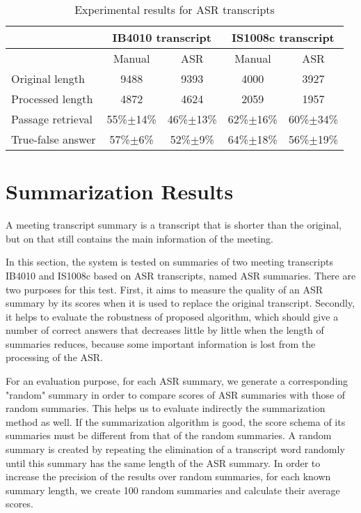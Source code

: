 \begin{table}[htbp]
\caption{Experimental results for ASR transcripts}
\begin{tabular}{|l|c|c|c|c|}
\hline
\multicolumn{1}{|c|}{} & \multicolumn{ 2}{c|}{IB4010 transcript} & \multicolumn{ 2}{c|}{IS1008c transcript} \\ \hline
\multicolumn{1}{|c|}{} & Manual & ASR & Manual & ASR \\ \hline
Original length & 9488 & 9393 & 4000 & 3927 \\ \hline
Processed length & 4872 & 4624 & 2059 & 1957 \\ \hline
Passage retrieval & 55\%\ensuremath{\pm}14\% & 46\%\ensuremath{\pm}13\% & 62\%\ensuremath{\pm}16\% & 60\%\ensuremath{\pm}34\% \\ \hline
True-false answer & 57\%\ensuremath{\pm}6\% & 52\%\ensuremath{\pm}9\% & 64\%\ensuremath{\pm}18\% & 56\%\ensuremath{\pm}19\% \\ \hline
\end{tabular}
\label{results for ASR transcripts}
\end{table}



\section{Summarization Results}

A meeting transcript summary is a transcript that is shorter than the original, but on that still contains the main information of the meeting.

In this section, the system is tested on summaries of two meeting transcripts IB4010 and IS1008c based on ASR transcripts, named ASR summaries. There are two purposes for this test. First, it aims to measure the quality of an ASR summary by its scores when it is used to replace the original transcript. Secondly, it helps to evaluate the robustness of proposed algorithm, which should give a number of correct answers that decreases little by little when the length of summaries reduces, because some important information is lost from the processing of the ASR.

For an evaluation purpose, for each ASR summary, we generate a corresponding "random" summary in order to compare scores of ASR summaries with those of random summaries. This helps us to evaluate indirectly the summarization method as well. If the summarization algorithm is good, the score schema of its summaries must be different from that of the random summaries. A random summary is created by repeating the elimination of a transcript word randomly until this summary has the same length of the ASR summary. In order to increase the precision of the results over random summaries, for each known summary length, we create 100 random summaries and calculate their average scores.

